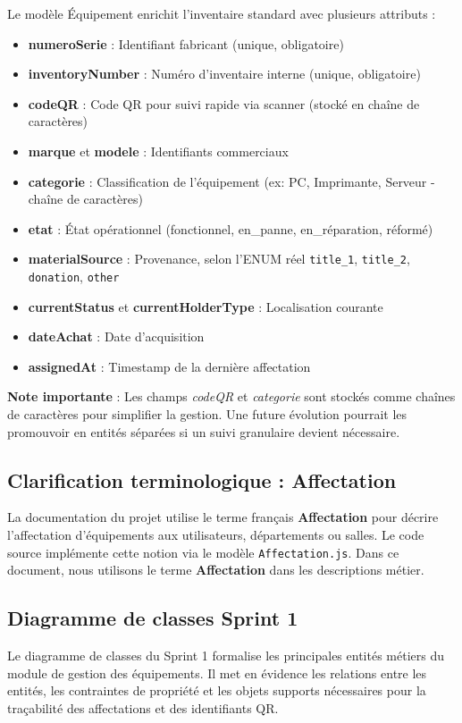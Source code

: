 Le modèle Équipement enrichit l'inventaire standard avec plusieurs attributs :

\begin{itemize}
    \item \textbf{numeroSerie} : Identifiant fabricant (unique, obligatoire)
    \item \textbf{inventoryNumber} : Numéro d'inventaire interne (unique, obligatoire)
    \item \textbf{codeQR} : Code QR pour suivi rapide via scanner (stocké en chaîne de caractères)
    \item \textbf{marque} et \textbf{modele} : Identifiants commerciaux
    \item \textbf{categorie} : Classification de l'équipement (ex: PC, Imprimante, Serveur - chaîne de caractères)
    \item \textbf{etat} : État opérationnel (fonctionnel, en\_panne, en\_réparation, réformé)
    \item \textbf{materialSource} : Provenance, selon l'ENUM réel \texttt{title\_1}, \texttt{title\_2}, \texttt{donation}, \texttt{other}
    \item \textbf{currentStatus} et \textbf{currentHolderType} : Localisation courante
    \item \textbf{dateAchat} : Date d'acquisition
    \item \textbf{assignedAt} : Timestamp de la dernière affectation
\end{itemize}

\textbf{Note importante} : Les champs \textit{codeQR} et \textit{categorie} sont stockés comme chaînes 
de caractères pour simplifier la gestion. Une future évolution pourrait les promouvoir en entités 
séparées si un suivi granulaire devient nécessaire.

\subsection{Clarification terminologique : Affectation}

La documentation du projet utilise le terme français \textbf{Affectation} pour décrire 
l'affectation d'équipements aux utilisateurs, départements ou salles. Le code source 
implémente cette notion via le modèle \texttt{Affectation.js}. Dans ce document, nous 
utilisons le terme \textbf{Affectation} dans les descriptions métier.

\subsection{Diagramme de classes Sprint 1}
Le diagramme de classes du Sprint 1 formalise les principales entités métiers du module de gestion des équipements. Il met en évidence les relations entre les entités, les contraintes de propriété et les objets supports nécessaires pour la traçabilité des affectations et des identifiants QR.

